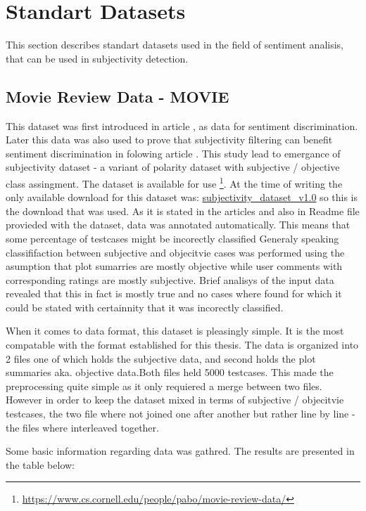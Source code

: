 \section{ Standart Datasets }

This section describes standart datasets used in the field of sentiment analisis, that can be used in subjectivity detection.

\subsection{ Movie Review Data - MOVIE }

This dataset was first introduced in article \cite{PangLee2002}, as data for sentiment discrimination. Later this data was also used to prove that
subjectivity filtering can benefit sentiment discrimination in folowing article \cite{PangLee2004}. This study lead to emergance of subjectivity dataset
 - a variant of polarity dataset with subjective / objective class assingment.
The dataset is available for use \footnote{ \url{https://www.cs.cornell.edu/people/pabo/movie-review-data/} }. At the time of writing the only available
download for this dataset was: \url{subjectivity_dataset_v1.0} so this is the download that was used. As it is stated in the articles and also in 
Readme file provieded with the dataset, data was annotated automatically. This means that some percentage of testcases might be incorectly classified
Generaly speaking classififaction between subjective and objecitvie cases was performed using the asumption that plot sumarries are mostly objective
while user comments with corresponding ratings are mostly subjective. Brief analisys of the input data revealed that this in fact is mostly true and no
cases where found for which it could be stated with certainnity that it was incorectly classified.

When it comes to data format, this dataset is pleasingly simple. It is the most compatable with the format established for this thesis. The data is organized
into 2 files one of which holds the subjective data, and second holds the plot summaries aka. objective data.Both files held 5000 testcases. This made the preprocessing quite simple as it only
requiered a merge between two files. However in order to keep the dataset mixed in terms of subjective / objecitvie testcases, the two file where not joined one
after another but rather line by line - the files where interleaved together.

Some basic information regarding data was gathred. The results are presented in the table below:

